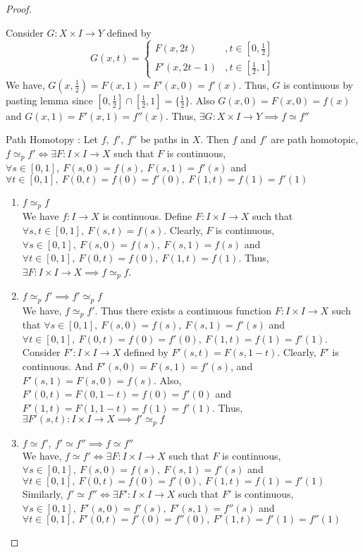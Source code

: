 \begin{proof}
\begin{enumerate}
			Consider $G:X \times I \to Y$ defined by \[ G(x,t) = \begin{cases} F(x,2t) & , t \in [0,\frac{1}{2}]\\ F'(x,2t-1) & , t \in [\frac{1}{2},1] \end{cases} \] We have, $G(x,\frac{1}{2}) = F(x,1) = F'(x,0) = f'(x)$. Thus, $G$ is continuous by pasting lemma since $[0,\frac{1}{2}] \cap [\frac{1}{2},1] = \{ \frac{1}{2}\}$. Also $G(x,0) = F(x,0) = f(x)$ and $G(x,1) = F'(x,1) = f''(x)$. Thus, $\exists G : X \times I \to Y \implies f \simeq f''$
	\end{enumerate}
	Path Homotopy : Let $f,\ f',\ f''$ be paths in $X$. Then $f$ and $f'$ are path homotopic, $f \simeq_p f' \iff \exists F : I \times I \to X$ such that $F$ is continuous, $\forall s \in [0,1],\ F(s,0)=f(s),\ F(s,1)=f'(s)$ and $\forall t \in [0,1],\ F(0,t)=f(0)=f'(0),\ F(1,t)=f(1)=f'(1)$
	\begin{enumerate}
		\item $f \simeq_p f$ \\
			We have $f : I \to X$ is continuous. Define $F : I \times I \to X$ such that $\forall s,t \in [0,1],\ F(s,t)=f(s)$. Clearly, $F$ is continuous, $\forall s \in [0,1],\ F(s,0) = f(s),\ F(s,1) = f(s)$ and $\forall t \in [0,1],\ F(0,t) = f(0),\ F(1,t) = f(1)$. Thus, $\exists F : I \times I \to X \implies f \simeq_p f$.
		\item $f \simeq_p f' \implies f' \simeq_p f$\\
			We have, $f \simeq_p f'$. Thus there exists a continuous function $F : I \times I \to X$ such that $\forall s \in [0,1],\ F(s,0) = f(s),\ F(s,1) = f'(s)$ and $\forall t \in [0,1],\ F(0,t)=f(0)=f'(0),\ F(1,t) = f(1) = f'(1)$.\\
			
			Consider $F' : I \times I \to X$ defined by $F'(s,t) = F(s,1-t)$. Clearly, $F'$ is continuous. And $F'(s,0) = F(s,1) = f'(s)$, and $F'(s,1) = F(s,0) = f(s)$. Also, $F'(0,t) = F(0,1-t) = f(0) = f'(0)$ and $F'(1,t) = F(1,1-t) = f(1) = f'(1)$. Thus, $\exists F'(s,t) : I \times I \to X \implies f' \simeq_p f$
		\item $f \simeq f',\ f' \simeq f'' \implies f \simeq f''$\\
			We have, $f \simeq f' \iff \exists F : I \times I \to X$ such that $F$ is continuous, $\forall s \in [0,1],\ F(s,0)=f(s),\ F(s,1)=f'(s)$ and $\forall t \in [0,1],\ F(0,t)=f(0)=f'(0),\ F(1,t)=f(1)=f'(1)$\\
			
			Similarly, $f' \simeq f'' \iff \exists F' : I \times I \to X$ such that $F'$ is continuous, $\forall s \in [0,1],\ F'(s,0)=f'(s),\ F'(s,1)=f''(s)$ and $\forall t \in [0,1],\ F'(0,t)=f'(0)=f''(0),\ F'(1,t)=f'(1)=f''(1)$\\


\end{enumerate}
\end{proof}
